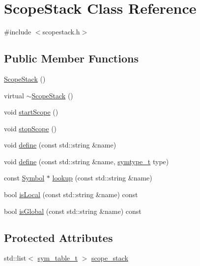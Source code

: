 \hypertarget{class_scope_stack}{
\section{ScopeStack Class Reference}
\label{class_scope_stack}
}


{\ttfamily \#include $<$scopestack.h$>$}

\subsection*{Public Member Functions}
\begin{DoxyCompactItemize}
\item 
\hyperlink{class_scope_stack_a754459e71e5e91fd4210c063014634c2}{ScopeStack} ()
\item 
virtual \hyperlink{class_scope_stack_a64e2f6ee2758341a649bbbc873b4c626}{$\sim$ScopeStack} ()
\item 
void \hyperlink{class_scope_stack_ae5809bddef2aa253460c1d35ed36c1c8}{startScope} ()
\item 
void \hyperlink{class_scope_stack_a410129444ad5a4be8784007d1fd73129}{stopScope} ()
\item 
void \hyperlink{class_scope_stack_a16f903a19a7223c925d00fe6ba4155f2}{define} (const std::string \&name)
\item 
void \hyperlink{class_scope_stack_ae0c9aa708ebe375e6d4c4eebc4ffc60a}{define} (const std::string \&name, \hyperlink{symbol_8h_a07090a2a79cb68ad8d84e7ecd6558859}{symtype\_\-t} type)
\item 
const \hyperlink{class_symbol}{Symbol} $\ast$ \hyperlink{class_scope_stack_a93cb7113443905f602ba812587e01b4d}{lookup} (const std::string \&name)
\item 
bool \hyperlink{class_scope_stack_a553478b9e13cba1cf77b7f0e7a91c6f4}{isLocal} (const std::string \&name) const 
\item 
bool \hyperlink{class_scope_stack_ae0792790e8cfd148e0cfb67090a790bf}{isGlobal} (const std::string \&name) const 
\end{DoxyCompactItemize}
\subsection*{Protected Attributes}
\begin{DoxyCompactItemize}
\item 
std::list$<$ \hyperlink{scopestack_8h_ac00f2f845911b84646322b4b1c7bc14c}{sym\_\-table\_\-t} $>$ \hyperlink{class_scope_stack_affa1115b1547064c04186846fd594344}{scope\_\-stack}
\end{DoxyCompactItemize}


